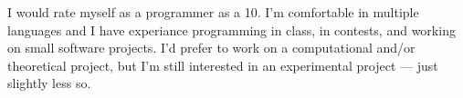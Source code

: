 I would rate myself as a programmer as a 10. I'm comfortable in multiple languages and I have experiance programming in class, in contests, and working on small software projects.
I'd prefer to work on a computational and/or theoretical project, but I'm still interested in an experimental project --- just slightly less so.
